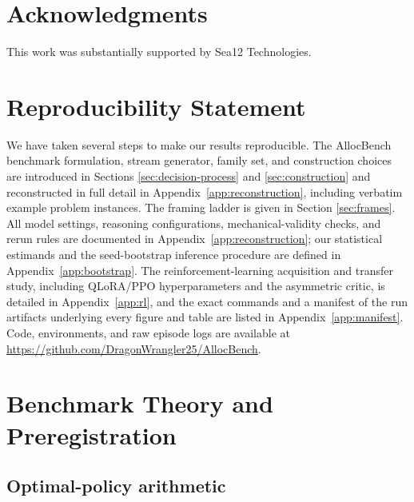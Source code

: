 \documentclass{article}
\begin{document}
\section{Acknowledgments}

This work was substantially supported by Sea12 Technologies.

\section*{Reproducibility Statement}

We have taken several steps to make our results reproducible. The AllocBench benchmark formulation, stream generator, family set, and construction choices are introduced in Sections \ref{sec:decision-process} and \ref{sec:construction} and reconstructed in full detail in Appendix~\ref{app:reconstruction}, including verbatim example problem instances. The framing ladder is given in Section \ref{sec:frames}. All model settings, reasoning configurations, mechanical-validity checks, and rerun rules are documented in Appendix~\ref{app:reconstruction}; our statistical estimands and the seed-bootstrap inference procedure are defined in Appendix~\ref{app:bootstrap}. The reinforcement-learning acquisition and transfer study, including QLoRA/PPO hyperparameters and the asymmetric critic, is detailed in Appendix~\ref{app:rl}, and the exact commands and a manifest of the run artifacts underlying every figure and table are listed in Appendix~\ref{app:manifest}. Code, environments, and raw episode logs are available at \url{https://github.com/DragonWrangler25/AllocBench}.



\newpage

\appendix

\section{Benchmark Theory and Preregistration} \label{app:design-details}

\subsection{Optimal-policy arithmetic} \label{app:policy-math}
\end{document}
